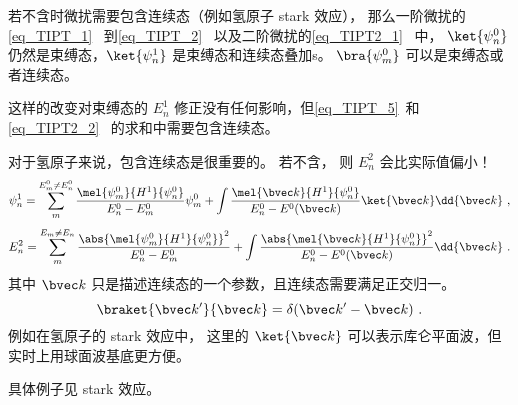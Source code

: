 
\begin{issues}
\issueDraft
\end{issues}


若不含时微扰需要包含连续态（例如氢原子 stark 效应）， 那么一阶微扰的\autoref{eq_TIPT_1}~ 到\autoref{eq_TIPT_2}~ 以及二阶微扰的\autoref{eq_TIPT2_1}~ 中， $\ket{\psi_n^0}$ 仍然是束缚态，$\ket{\psi_n^1}$ 是束缚态和连续态叠加s。 $\bra{\psi_m^0}$ 可以是束缚态或者连续态。

这样的改变对束缚态的 $E_n^1$ 修正没有任何影响，但\autoref{eq_TIPT_5}~和\autoref{eq_TIPT2_2}~ 的求和中需要包含连续态。

对于氢原子来说，包含连续态是很重要的。 若不含， 则 $E_n^2$ 会比实际值偏小！
\begin{equation}
\psi_n^1 = \sum_m^{E_m^0 \ne E_n^0} \frac{\mel{\psi_m^0}{H^1}{\psi_n^0}}{E_n^0 - E_m^0} \psi_m^0
+ \int \frac{\mel{\bvec k}{H^1}{\psi_n^0}}{E_n^0 - E^0(\bvec k)} \ket{\bvec k}\dd{\bvec k}~,
\end{equation}
%
\begin{equation}\label{eq_TIPTc_1}
E_n^2 = \sum_{m}^{E_m\ne E_n} \frac{\abs{\mel{\psi_m^0}{H^1}{\psi_n^0}}^2}{E_n^0-E_m^0}
+ \int \frac{\abs{\mel{\bvec k}{H^1}{\psi_n^0}}^2}{E_n^0-E^0(\bvec k)}\dd{\bvec k}~.
\end{equation}
其中 $\bvec k$ 只是描述连续态的一个参数，且连续态需要满足正交归一。
\begin{equation}
\braket{\bvec k'}{\bvec k} = \delta(\bvec k'-\bvec k)~.
\end{equation}
例如在氢原子的 stark 效应中， 这里的 $\ket{\bvec k}$ 可以表示库仑平面波，但实时上用球面波基底更方便。

具体例子见 stark 效应。

